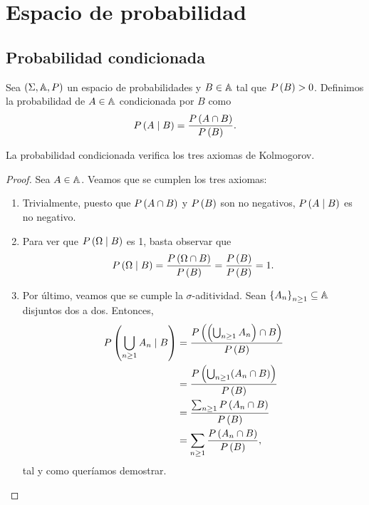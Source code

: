 \chapter{Espacio de probabilidad}

\section{Probabilidad condicionada}

\begin{definition}
  Sea $(\Sigma, \mathbb{A}, P)$ un espacio de probabilidades y $B \in \mathbb{A}$ tal que $P\left(B\right) > 0$. Definimos la probabilidad de $A \in \mathbb{A}$ condicionada por $B$ como
  \[
    P\left(A \mid B\right) = \frac{P\left(A \cap B\right)}{P\left(B\right)}.
  \]
\end{definition}

\begin{proposition}
  La probabilidad condicionada verifica los tres axiomas de Kolmogorov.
\end{proposition}

\begin{proof}
  Sea $A \in \mathbb{A}$. Veamos que se cumplen los tres axiomas:
  \begin{enumerate}
    \item Trivialmente, puesto que $P\left(A \cap B\right)$ y $P\left(B\right)$ son no negativos, $P\left(A \mid B\right)$ es no negativo.
    \item Para ver que $P\left(\Omega \mid B\right)$ es 1, basta observar que
    \[
      P\left(\Omega \mid B\right) = \frac{P\left(\Omega \cap B\right)}{P\left(B\right)}
      = \frac{P\left(B\right)}{P\left(B\right)} = 1.
    \]
    \item Por último, veamos que se cumple la $\sigma$-aditividad. Sean $\left\lbrace A_n\right\rbrace_{n \ge 1} \subseteq \mathbb{A}$ disjuntos dos a dos. Entonces,
    \[
      \begin{split}
        P\left(\bigcup_{n \ge 1} A_n \mid B\right) &= \frac{P\left(\left(\bigcup_{n \ge 1} A_n\right) \cap B\right)}{P\left(B\right)} \\
        &= \frac{P\left(\bigcup_{n \ge 1} (A_n \cap B)\right)}{P\left(B\right)} \\
        &= \frac{\sum_{n \ge 1} P\left(A_n \cap B\right)}{P\left(B\right)} \\
        &= \sum_{n \ge 1} \frac{P\left(A_n \cap B\right)}{P\left(B\right)}, \\
      \end{split}
    \]
    tal y como queríamos demostrar.
  \end{enumerate}
\end{proof}

